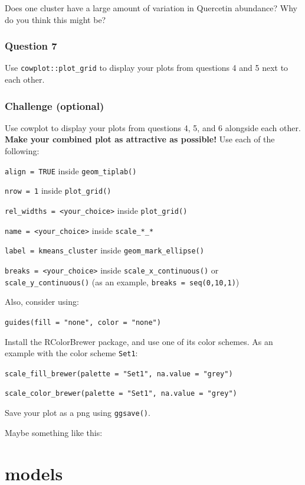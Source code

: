 \documentclass[
]{krantz}
\begin{document}
Does one cluster have a large amount of variation in Quercetin abundance? Why do you think this might be?

\hypertarget{question-7}{%
\subsubsection{Question 7}\label{question-7}}

Use \texttt{cowplot::plot\_grid} to display your plots from questions 4 and 5 next to each other.

\hypertarget{challenge-optional}{%
\subsubsection{Challenge (optional)}\label{challenge-optional}}

Use cowplot to display your plots from questions 4, 5, and 6 alongside each other. \textbf{Make your combined plot as attractive as possible!} Use each of the following:

\texttt{align\ =\ TRUE} inside \texttt{geom\_tiplab()}

\texttt{nrow\ =\ 1} inside \texttt{plot\_grid()}

\texttt{rel\_widths\ =\ \textless{}your\_choice\textgreater{}} inside \texttt{plot\_grid()}

\texttt{name\ =\ \textless{}your\_choice\textgreater{}} inside \texttt{scale\_*\_*}

\texttt{label\ =\ kmeans\_cluster} inside \texttt{geom\_mark\_ellipse()}

\texttt{breaks\ =\ \textless{}your\_choice\textgreater{}} inside \texttt{scale\_x\_continuous()} or \texttt{scale\_y\_continuous()} (as an example, \texttt{breaks\ =\ seq(0,10,1)})

Also, consider using:

\texttt{guides(fill\ =\ "none",\ color\ =\ "none")}

Install the RColorBrewer package, and use one of its color schemes. As an example with the color scheme \texttt{Set1}:

\texttt{scale\_fill\_brewer(palette\ =\ "Set1",\ na.value\ =\ "grey")}

\texttt{scale\_color\_brewer(palette\ =\ "Set1",\ na.value\ =\ "grey")}

Save your plot as a png using \texttt{ggsave()}.

Maybe something like this:

\hypertarget{models}{%
\section{models}\label{models}}
\end{document}
